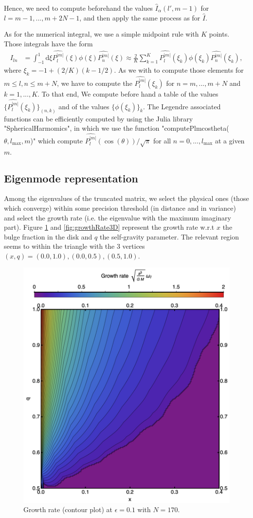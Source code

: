 \documentclass[11pt]{article}
\newcommand{\rd}{\mathrm{d}}
\newcommand{\Pnm}{P_n^{|m|}}
\newcommand{\Plm}{P_l^{|m|}}
\newcommand{\hPnm}{\widehat{\Pnm}}
\newcommand{\hPlm}{\widehat{\Plm}}
\newcommand{\hI}{\widehat{I}}
\begin{document}
Hence, we need to compute beforehand the values $\hI_{\alpha}(l',m-1)$ for $l=m-1,...,m+2N-1$, and then apply the same process as for $\hI$. 

As for the numerical integral, we use a simple midpoint rule with $K$ points. Those integrals have the form
\begin{align}
I_{ln} &= \int_{-1}^{1} \rd \xi \hPlm(\xi) \phi(\xi) \hPnm(\xi) \approx \frac{2}{K} \sum_{k=1}^{K} \hPlm(\xi_{k}) \phi(\xi_{k}) \hPnm(\xi_{k}),
\end{align}
where $\xi_{k} = -1 + (2/K)(k-1/2)$. As we with to compute those elements for $m \leq l,n \leq m+N$, we have to compute the $\hPlm(\xi_{k})$ for $n=m,...,m+N$ and $k=1,...,K$. To that end, We compute before hand a table of the values $\{\hPlm(\xi_{k})\}_{(n,k)}$ and of the values $\{\phi(\xi_{k})\}_{k}$. The Legendre associated functions can be efficiently computed by using the Julia library "SphericalHarmomics", in which we use the function "computePlmcostheta($\theta,l_{\max},m$)" which compute $\hPlm(\cos(\theta))/\sqrt{\pi}$ for all $n=0,...,l_{\max}$ at a given $m$.

\subsection{Eigenmode representation}


Among the eigenvalues of the truncated matrix, we select the physical ones (those which converge) within some precision threshold (in distance and in variance) and select the growth rate (i.e. the eigenvalue with the maximum imaginary part). Figure \ref{fig:growthRate} and \ref{fig:growthRate3D} represent the growth rate w.r.t $x$ the bulge fraction in the disk and $q$ the self-gravity parameter. The relevant region seems to within the triangle with the 3 vertices $(x,q)=(0.0,1.0), (0.0,0.5), (0.5,1.0)$.

\begin{figure}
    \centering
   \includegraphics[width=0.6 \textwidth]{figs/growthRate_eps0_1.png}
   \caption{Growth rate (contour plot) at $\epsilon=0.1$ with $N=170$.}
   \label{fig:growthRate}
\end{figure}
\end{document}
